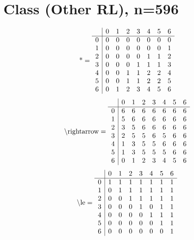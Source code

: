 \documentclass[11pt]{article}
\begin{document}
\section{Class (Other RL), n=596}
\[\text{*} = 
\begin{array}{r | r r r r r r r}
 & 0 & 1 & 2 & 3 & 4 & 5 & 6 \\ \hline
0 & 0 & 0 & 0 & 0 & 0 & 0 & 0 \\
1 & 0 & 0 & 0 & 0 & 0 & 0 & 1 \\
2 & 0 & 0 & 0 & 0 & 1 & 1 & 2 \\
3 & 0 & 0 & 0 & 1 & 1 & 1 & 3 \\
4 & 0 & 0 & 1 & 1 & 2 & 2 & 4 \\
5 & 0 & 0 & 1 & 1 & 2 & 2 & 5 \\
6 & 0 & 1 & 2 & 3 & 4 & 5 & 6 \\
\end{array}
\]
\[\text{\textbackslash rightarrow} = 
\begin{array}{r | r r r r r r r}
 & 0 & 1 & 2 & 3 & 4 & 5 & 6 \\ \hline
0 & 6 & 6 & 6 & 6 & 6 & 6 & 6 \\
1 & 5 & 6 & 6 & 6 & 6 & 6 & 6 \\
2 & 3 & 5 & 6 & 6 & 6 & 6 & 6 \\
3 & 2 & 5 & 5 & 6 & 5 & 6 & 6 \\
4 & 1 & 3 & 5 & 5 & 6 & 6 & 6 \\
5 & 1 & 3 & 5 & 5 & 5 & 6 & 6 \\
6 & 0 & 1 & 2 & 3 & 4 & 5 & 6 \\
\end{array}
\]
\[\text{\textbackslash le} = 
\begin{array}{r | r r r r r r r}
 & 0 & 1 & 2 & 3 & 4 & 5 & 6 \\ \hline
0 & 1 & 1 & 1 & 1 & 1 & 1 & 1 \\
1 & 0 & 1 & 1 & 1 & 1 & 1 & 1 \\
2 & 0 & 0 & 1 & 1 & 1 & 1 & 1 \\
3 & 0 & 0 & 0 & 1 & 0 & 1 & 1 \\
4 & 0 & 0 & 0 & 0 & 1 & 1 & 1 \\
5 & 0 & 0 & 0 & 0 & 0 & 1 & 1 \\
6 & 0 & 0 & 0 & 0 & 0 & 0 & 1 \\
\end{array}
\]
\end{document}
